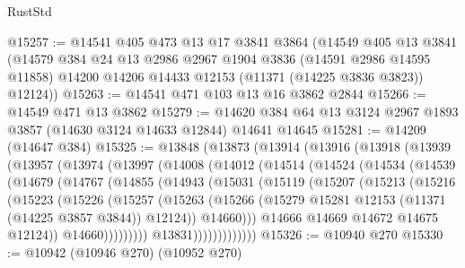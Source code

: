 \begin{lexlean}{RustStd}
\begin{coremodule}
{\begin{coremodule}
{{{{{{{{{{{{{{{{{{{{{{{{{{{{{{{{{@15257 := @14541
    @405
    @473
    @13
    @17
    @3841
    @3864
    (@14549
      @405
      @13
      @3841
      (@14579
        @384
        @24
        @13
        @2986
        @2967
        @1904
        @3836
        (@14591 @2986 @14595 @11858)
        @14200
        @14206
        @14433
        @12153
        (@11371 (@14225 @3836 @3823))
        @12124))
@15263 := @14541 @471 @103 @13 @16 @3862 @2844
@15266 := @14549 @471 @13 @3862
@15279 := @14620 @384 @64 @13 @3124 @2967 @1893 @3857 (@14630 @3124 @14633 @12844) @14641 @14645
@15281 := @14209 (@14647 @384)
@15325 := @13848
    (@13873
      (@13914
        (@13916
          (@13918
            (@13939
              (@13957
                (@13974
                  (@13997
                    (@14008
                      (@14012
                        (@14514
                          (@14524
                            (@14534
                              (@14539
                                (@14679
                                  (@14767
                                    (@14855
                                      (@14943
                                        (@15031
                                          (@15119
                                            (@15207
                                              (@15213
                                                (@15216
                                                  (@15223
                                                    (@15226
                                                      (@15257
                                                        (@15263
                                                          (@15266
                                                            (@15279
                                                              @15281
                                                              @12153
                                                              (@11371 (@14225 @3857 @3844))
                                                              @12124))
                                                          @14660)))
                                                    @14666
                                                    @14669
                                                    @14672
                                                    @14675
                                                    @12124))
                                                @14660)))))))))
                              @13831)))))))))))))
@15326 := @10940 @270
@15330 := @10942 (@10946 @270) (@10952 @270)
}}}}}}}}}}}}}}}}}}}}}}}}}}}}}}}}}
\end{coremodule}}
\end{coremodule}
\end{lexlean}
